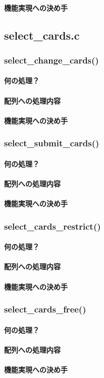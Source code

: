 \documentclass[11pt,a4paper, uplatex]{jsarticle}
\begin{document}
\paragraph{機能実現への決め手}
%
\subsection{select\_cards.c}
%
\subsubsection{select\_change\_cards()}
\paragraph{何の処理？}
\paragraph{配列への処理内容}
\paragraph{機能実現への決め手}
%
\subsubsection{select\_submit\_cards()}
\paragraph{何の処理？}
\paragraph{配列への処理内容}
\paragraph{機能実現への決め手}
%
\subsubsection{select\_cards\_restrict()}
\paragraph{何の処理？}
\paragraph{配列への処理内容}
\paragraph{機能実現への決め手}
%
\subsubsection{select\_cards\_free()}
\paragraph{何の処理？}
\paragraph{配列への処理内容}
\paragraph{機能実現への決め手}
\end{document}
